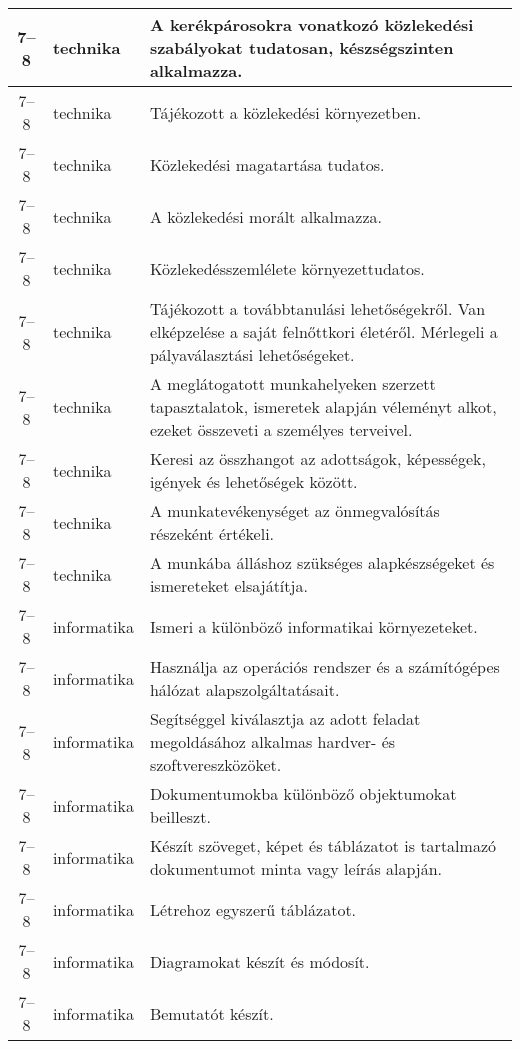 \begin{small}
\begin{longtable}{c | p{2cm} |  p{11cm} }
              7--8 & technika & A kerékpárosokra vonatkozó közlekedési szabályokat tudatosan, készségszinten alkalmazza. \\ \hline
              7--8 & technika & Tájékozott a közlekedési környezetben. \\ \hline
              7--8 & technika & Közlekedési magatartása tudatos. \\ \hline
              7--8 & technika & A közlekedési morált alkalmazza. \\ \hline
              7--8 & technika & Közlekedésszemlélete környezettudatos. \\ \hline
              7--8 & technika & Tájékozott a továbbtanulási lehetőségekről. Van elképzelése a saját felnőttkori életéről. Mérlegeli a pályaválasztási lehetőségeket. \\ \hline
              7--8 & technika & A meglátogatott munkahelyeken szerzett tapasztalatok, ismeretek alapján véleményt alkot, ezeket összeveti a személyes terveivel. \\ \hline
              7--8 & technika & Keresi az összhangot az adottságok, képességek, igények és lehetőségek között. \\ \hline
              7--8 & technika & A munkatevékenységet az önmegvalósítás részeként értékeli. \\ \hline
              7--8 & technika & A munkába álláshoz szükséges alapkészségeket és ismereteket elsajátítja. \\ \hline
              7--8 & informatika & Ismeri a különböző informatikai környezeteket. \\ \hline
              7--8 & informatika & Használja az operációs rendszer és a számítógépes hálózat alapszolgáltatásait. \\ \hline
              7--8 & informatika & Segítséggel kiválasztja az adott feladat megoldásához alkalmas hardver- és szoftvereszközöket. \\ \hline
              7--8 & informatika & Dokumentumokba különböző objektumokat beilleszt. \\ \hline
              7--8 & informatika & Készít szöveget, képet és táblázatot is tartalmazó dokumentumot minta vagy leírás alapján. \\ \hline
              7--8 & informatika & Létrehoz egyszerű táblázatot. \\ \hline
              7--8 & informatika & Diagramokat készít és módosít. \\ \hline
              7--8 & informatika & Bemutatót készít. \\ \hline

\end{longtable}
\end{small}
